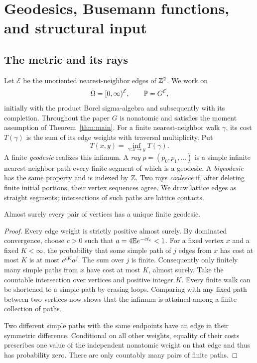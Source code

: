 \section{Geodesics, Busemann functions, and structural input}
\label{sec:preliminaries}

\subsection{The metric and its rays}
Let \(\mathcal E\) be the unoriented nearest-neighbor edges of \(\mathbb Z^2\).
We work on
\[
 \Omega=[0,\infty)^{\mathcal E},\qquad \mathbb P=G^{\mathcal E},
\]
initially with the product Borel sigma-algebra and subsequently with its
completion. Throughout the paper \(G\) is nonatomic and satisfies the
moment assumption of Theorem~\ref{thm:main}.
For a finite nearest-neighbor walk \(\gamma\), its cost \(T(\gamma)\)
is the sum of its edge weights with traversal multiplicity. Put
\[
 T(x,y)=\inf_{\gamma:x\longrightarrow y}T(\gamma).
\]
A finite \emph{geodesic} realizes this infimum. A \emph{ray}
\(p=(p_0,p_1,\ldots)\) is a simple infinite nearest-neighbor path every
finite segment of which is a geodesic. A \emph{bigeodesic} has the same
property and is indexed by \(\mathbb Z\).
Two rays \emph{coalesce} if, after deleting finite initial portions,
their vertex sequences agree.
We draw lattice edges as straight segments; intersections of such paths
are lattice contacts.

\begin{lemma}\label{lem:finite-minimizers}
Almost surely every pair of vertices has a unique finite geodesic.
\end{lemma}
\begin{proof}
Every edge weight is strictly positive almost surely. By dominated
convergence, choose \(c>0\) such that
\(a=4\mathbb E e^{-ct_e}<1\).
For a fixed vertex \(x\) and a fixed \(K<\infty\), the probability that
some simple path of \(j\) edges from \(x\) has cost at most \(K\) is
at most \(e^{cK}a^j\). The sum over \(j\) is finite.
Consequently only finitely many simple paths from \(x\) have cost at
most \(K\), almost surely. Take the countable intersection over vertices
and positive integer \(K\).
Every finite walk can be shortened to a simple path by erasing loops.
Comparing with any fixed path between two vertices now shows that the
infimum is attained among a finite collection of paths.

Two different simple paths with the same endpoints have an edge in their
symmetric difference. Conditional on all other weights, equality of their
costs prescribes one value of the independent nonatomic weight on that
edge and thus has probability zero. There are only countably many pairs
of finite paths.
\end{proof}

